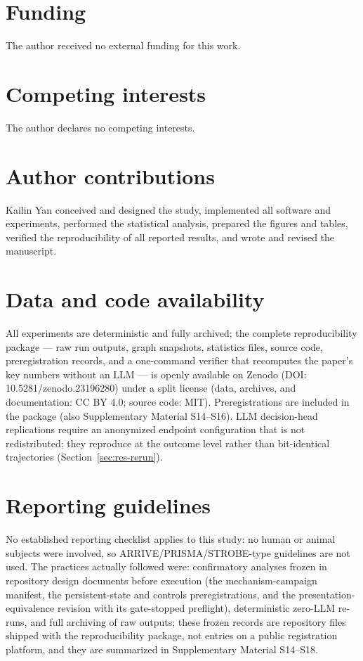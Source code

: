 \documentclass[10pt]{article}
\begin{document}

\section*{Funding}
The author received no external funding for this work.

\section*{Competing interests}
The author declares no competing interests.

\section*{Author contributions}
Kailin Yan conceived and designed the study, implemented all software and experiments, performed the statistical analysis, prepared the figures and tables, verified the reproducibility of all reported results, and wrote and revised the manuscript.

\section*{Data and code availability}
All experiments are deterministic and fully archived; the complete reproducibility package --- raw run outputs, graph snapshots, statistics files, source code, preregistration records, and a one-command verifier that recomputes the paper's key numbers without an LLM --- is openly available on Zenodo (DOI: 10.5281/zenodo.23196280) under a split license (data, archives, and documentation: CC BY 4.0; source code: MIT). Preregistrations are included in the package (also Supplementary Material S14--S16). LLM decision-head replications require an anonymized endpoint configuration that is not redistributed; they reproduce at the outcome level rather than bit-identical trajectories (Section~\ref{sec:res-rerun}).

\section*{Reporting guidelines}
No established reporting checklist applies to this study: no human or animal subjects were involved, so ARRIVE/PRISMA/STROBE-type guidelines are not used. The practices actually followed were: confirmatory analyses frozen in repository design documents before execution (the mechanism-campaign manifest, the persistent-state and controls preregistrations, and the presentation-equivalence revision with its gate-stopped preflight), deterministic zero-LLM re-runs, and full archiving of raw outputs; these frozen records are repository files shipped with the reproducibility package, not entries on a public registration platform, and they are summarized in Supplementary Material S14--S18.
\end{document}
